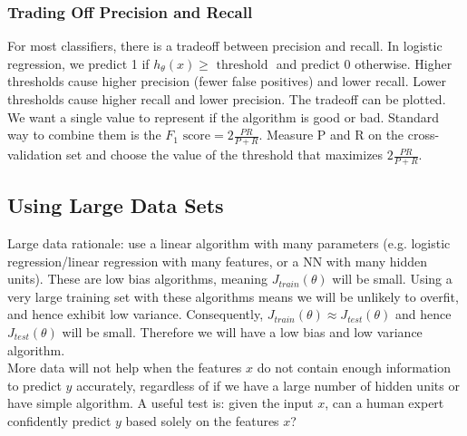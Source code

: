 \documentclass[11pt,letterpaper]{article}
\begin{document}
\subsubsection{Trading Off Precision and Recall}
For most classifiers, there is a tradeoff between precision and recall. In logistic regression, we predict 1 if $h_\theta(x) \geq \textrm{ threshold }$ and predict 0 otherwise. Higher thresholds cause higher precision (fewer false positives) and lower recall. Lower thresholds cause higher recall and lower precision. The tradeoff can be plotted.\\
We want a single value to represent if the algorithm is good or bad. Standard way to combine them is the $F_1 \textrm{ score} = 2\frac{PR}{P+R}$. Measure P and R on the cross-validation set and choose the value of the threshold that maximizes $2\frac{PR}{P+R}$.
\subsection{Using Large Data Sets}
Large data rationale: use a linear algorithm with many parameters (e.g. logistic regression/linear regression with many features, or a NN with many hidden units). These are low bias algorithms, meaning $J_{train}(\theta)$ will be small. Using a very large training set with these algorithms means we will be unlikely to overfit, and hence exhibit low variance. Consequently, $J_{train}(\theta) \approx J_{test}(\theta)$ and hence $J_{test}(\theta)$ will be small. Therefore we will have a low bias and low variance algorithm.\\
More data will not help when the features $x$ do not contain enough information to predict $y$ accurately, regardless of if we have a large number of hidden units or have simple algorithm. A useful test is: given the input $x$, can a human expert confidently predict $y$ based solely on the features $x$?
\end{document}
